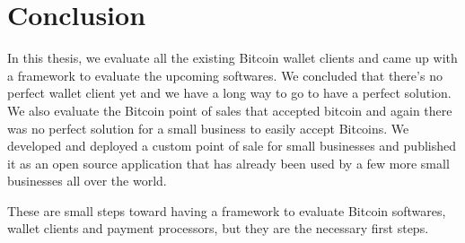 
\chapter{Conclusion}

In this thesis, we evaluate all the existing Bitcoin wallet clients and came up with a framework to evaluate the upcoming softwares. We concluded that there's no perfect wallet client yet and we have a long way to go to have a perfect solution. We also evaluate the Bitcoin point of sales that accepted bitcoin and again there was no perfect solution for a small business to easily accept Bitcoins. We developed and deployed a custom point of sale for small businesses and published it as an open source application that has already been used by a few more small businesses all over the world.

These are small steps toward having a framework to evaluate Bitcoin softwares, wallet clients and payment processors, but they are the necessary first steps.

 
